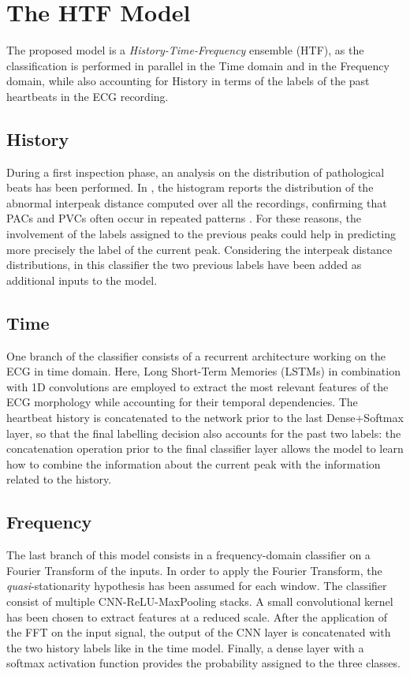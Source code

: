 \documentclass[conference]{IEEEtran}
\begin{document}
\section{The HTF Model}
    The proposed model is a \textit{History-Time-Frequency} ensemble
    (HTF), as the classification is performed in parallel in the Time
    domain and in the Frequency domain, while also accounting for
    History in terms of the labels of the past heartbeats in the ECG
    recording. 

\subsection{History}
    During a first inspection phase, an analysis on the distribution
    of pathological beats has been performed. In , the
    histogram reports the distribution of the abnormal interpeak
    distance computed over all the recordings, confirming that PACs
    and PVCs often occur in repeated patterns \cite{premature_v}
    \cite{frequent_premature}. For these reasons, the involvement of
    the labels assigned to the previous peaks could help in predicting
    more precisely the label of the current peak. Considering the
    interpeak distance distributions, in this classifier the two
    previous labels have been added as additional inputs to the model.

\subsection{Time}
    One branch of the classifier consists of a recurrent architecture
    working on the ECG in time domain. Here, Long Short-Term Memories
    (LSTMs) in combination with 1D convolutions are employed to
    extract the most relevant features of the ECG morphology while
    accounting for their temporal dependencies. The heartbeat history
    is concatenated to the network prior to the last Dense+Softmax
    layer, so that the final labelling decision also accounts for the
    past two labels: the concatenation operation prior to the final
    classifier layer allows the model to learn how to combine the
    information about the current peak with the information related to
    the history.

\subsection{Frequency}
    The last branch of this model consists in a frequency-domain
    classifier on a Fourier Transform of the inputs. In order to apply
    the Fourier Transform, the \textit{quasi}-stationarity hypothesis
    has been assumed for each window.
    The classifier consist of multiple CNN-ReLU-MaxPooling stacks. A
    small convolutional kernel has been chosen to extract features at
    a reduced scale. After the application of the FFT on the input
    signal, the output of the CNN layer is concatenated with the two
    history labels like in the time model. Finally, a dense layer with
    a softmax activation function provides the probability assigned to
    the three classes.  
\end{document}

